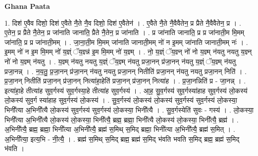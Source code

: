 \documentclass[17pt]{extarticle}
\begin{document}
\textbf{Ghana Paata } \newline

1. दिश॑ ए॒वैव दिशो॒ दिश॑ ए॒वैते नै॒ते नै॒व दिशो॒ दिश॑ ए॒वैतेन॑ । . ए॒वैते नै॒ते नै॒वैवैतेन॒ प्र प्रैते नै॒वैवैतेन॒ प्र । . ए॒तेन॒ प्र प्रैते नै॒तेन॒ प्र जा॑नाति जानाति॒ प्रैते नै॒तेन॒ प्र जा॑नाति । . प्र जा॑नाति जानाति॒ प्र प्र जा॑नाती॒म मि॒मम् जा॑नाति॒ प्र प्र जा॑नाती॒मम् । . जा॒ना॒ती॒म मि॒मम् जा॑नाति जानाती॒मम् नो॑ न इ॒मम् जा॑नाति जानाती॒मम् नः॑ । . इ॒मम् नो॑ न इ॒म मि॒मम् नो॑ य॒ज्ञ्ं ॅय॒ज्ञ्न्न॑ इ॒म मि॒मम् नो॑ य॒ज्ञ्म् । . नो॒ य॒ज्ञ्ं ॅय॒ज्ञ्न् नो॑ नो य॒ज्ञ्म् न॑यतु नयतु य॒ज्ञ्न् नो॑ नो य॒ज्ञ्म् न॑यतु । . य॒ज्ञ्म् न॑यतु नयतु य॒ज्ञ्ं ॅय॒ज्ञ्म् न॑यतु प्रजा॒नन् प्र॑जा॒नन् न॑यतु य॒ज्ञ्ं ॅय॒ज्ञ्म् न॑यतु प्रजा॒नन्न् । . न॒य॒तु॒ प्र॒जा॒नन् प्र॑जा॒नन् न॑यतु नयतु प्रजा॒नन् नितीति॑ प्रजा॒नन् न॑यतु नयतु प्रजा॒नन् निति॑ । . प्र॒जा॒नन् नितीति॑ प्रजा॒नन् प्र॑जा॒नन् नित्या॑हा॒हेति॑ प्रजा॒नन् प्र॑जा॒नन् नित्या॑ह । . प्र॒जा॒नन्निति॑ प्र - जा॒नन्न् । . इत्या॑हा॒हे तीत्या॑ह सुव॒र्गस्य॑ सुव॒र्गस्या॒हे तीत्या॑ह सुव॒र्गस्य॑ । . आ॒ह॒ सु॒व॒र्गस्य॑ सुव॒र्गस्या॑हाह सुव॒र्गस्य॑ लो॒कस्य॑ लो॒कस्य॑ सुव॒र्ग स्या॑हाह सुव॒र्गस्य॑ लो॒कस्य॑ । . सु॒व॒र्गस्य॑ लो॒कस्य॑ लो॒कस्य॑ सुव॒र्गस्य॑ सुव॒र्गस्य॑ लो॒कस्या॒ भिनी᳚त्या अ॒भिनी᳚त्यै लो॒कस्य॑ सुव॒र्गस्य॑ सुव॒र्गस्य॑ लो॒कस्या॒ भिनी᳚त्यै । . सु॒व॒र्गस्येति॑ सुवः - गस्य॑ । . लो॒कस्या॒ भिनी᳚त्या अ॒भिनी᳚त्यै लो॒कस्य॑ लो॒कस्या॒ भिनी᳚त्यै॒ ब्रह्म॒ ब्रह्मा॒ भिनी᳚त्यै लो॒कस्य॑ लो॒कस्या॒ भिनी᳚त्यै॒ ब्रह्म॑ । . अ॒भिनी᳚त्यै॒ ब्रह्म॒ ब्रह्मा॒ भिनी᳚त्या अ॒भिनी᳚त्यै॒ ब्रह्म॑ स॒मिथ् स॒मिद् ब्रह्मा॒ भिनी᳚त्या अ॒भिनी᳚त्यै॒ ब्रह्म॑ स॒मित् । . अ॒भिनी᳚त्या॒ इत्य॒भि - नी॒त्यै॒ । . ब्रह्म॑ स॒मिथ् स॒मिद् ब्रह्म॒ ब्रह्म॑ स॒मिद् भ॑वति भवति स॒मिद् ब्रह्म॒ ब्रह्म॑ स॒मिद् भ॑वति । \newline
\end{document}
